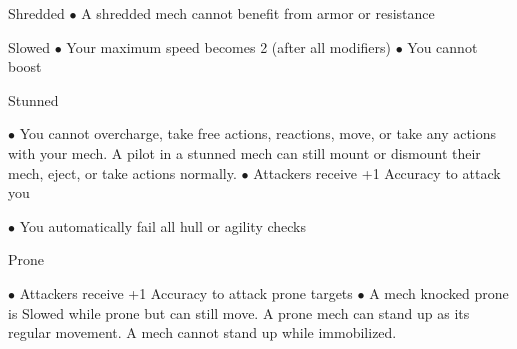Shredded
    $\bullet$    A shredded mech cannot benefit from armor or resistance





Slowed
     $\bullet$    Your maximum speed becomes 2 (after all modifiers)
     $\bullet$    You cannot boost

Stunned

     $\bullet$    You cannot overcharge, take free actions, reactions, move, or take any actions with your
         mech. A pilot in a stunned mech can still mount or dismount their mech, eject, or take
         actions normally.
     $\bullet$    Attackers receive +1 Accuracy to attack you

     $\bullet$    You automatically fail all hull or agility checks

Prone

     $\bullet$    Attackers receive +1 Accuracy to attack prone targets
     $\bullet$    A mech knocked prone is Slowed while prone but can still move. A prone mech can stand
         up as its regular movement. A mech cannot stand up while immobilized.
